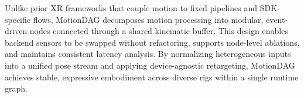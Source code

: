 Unlike prior XR frameworks that couple motion to fixed pipelines and SDK-specific flows, MotionDAG decomposes motion processing into modular, event-driven nodes connected through a shared kinematic buffer. This design enables backend sensors to be swapped without refactoring, supports node-level ablations, and maintains consistent latency analysis. By normalizing heterogeneous inputs into a unified pose stream and applying device-agnostic retargeting, MotionDAG achieves stable, expressive embodiment across diverse rigs within a single runtime graph.